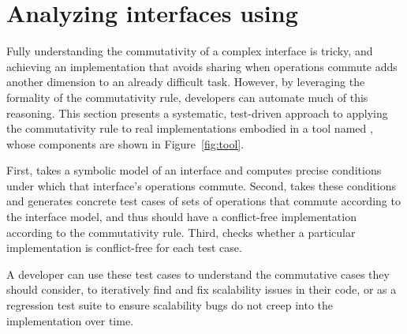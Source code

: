
\section{Analyzing interfaces using \tool{}}
\label{sec:model}


Fully understanding the commutativity of a complex interface is
tricky, and achieving an
implementation that avoids sharing when operations commute adds another
dimension to an already difficult task.  However, by leveraging the
formality of the commutativity rule, developers can automate much of this
reasoning.  This section presents a systematic, test-driven approach to
applying the commutativity rule to real implementations embodied in a
tool named \tool, whose components are shown in
Figure~\ref{fig:tool}.


\begin{figure*}

\caption{The components of \tool{}.}
\label{fig:tool}
\end{figure*}

First, \analyzer{} takes a symbolic model of
an interface and computes precise conditions under which that interface's
operations commute.  Second, \generator{} takes
these conditions and generates concrete test cases of sets of operations
that commute according to the interface model, and thus should
have a conflict-free implementation according to the commutativity rule.
%
Third, \mtrace checks whether a particular implementation is
conflict-free for each test case.

A developer can use these test cases to understand the
commutative cases they should consider,
to iteratively find and fix scalability
issues in their
code, or as a regression test suite to ensure
scalability bugs do not creep into the implementation over time.


\subsection{\analyzer{}}
\label{sec:model:analyzer}

